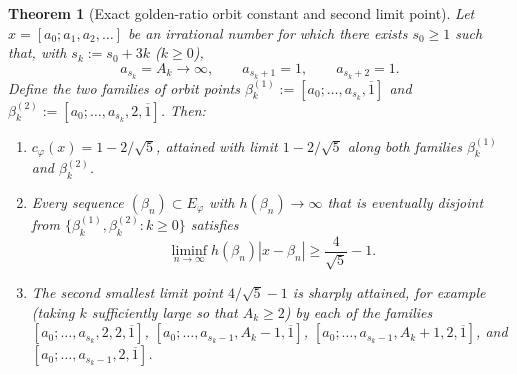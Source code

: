 \documentclass[11pt]{amsart}
\newtheorem{theorem}{Theorem}[section]
\theoremstyle{definition}
\theoremstyle{remark}
\numberwithin{equation}{section}
\begin{document}
\begin{theorem}[Exact golden-ratio orbit constant and second limit point]\label{thm:golden-exact-second}
Let $x=[a_0;a_1,a_2,\ldots]$ be an irrational number for which there
exists $s_0\ge1$ such that, with $s_k:=s_0+3k$ ($k\ge0$),
\[
 a_{s_k}=A_k\to\infty,\qquad a_{s_k+1}=1,\qquad a_{s_k+2}=1.
\]
Define the two families of orbit points
$\beta_k^{(1)}:=[a_0;\ldots,a_{s_k},\overline1]$ and
$\beta_k^{(2)}:=[a_0;\ldots,a_{s_k},2,\overline1]$. Then:
\begin{enumerate}
\item $c_\varphi(x)=1-2/\sqrt5$, attained with limit $1-2/\sqrt5$ along
      both families $\beta_k^{(1)}$ and $\beta_k^{(2)}$.
\item Every sequence $(\beta_n)\subset E_\varphi$ with
      $h(\beta_n)\to\infty$ that is eventually disjoint from
      $\{\beta_k^{(1)},\beta_k^{(2)}:k\ge0\}$ satisfies
      \[
       \liminf_{n\to\infty} h(\beta_n)|x-\beta_n|\ge \frac{4}{\sqrt5}-1.
      \]
\item The second smallest limit point $4/\sqrt5-1$ is sharply attained,
      for example (taking $k$ sufficiently large so that $A_k\ge2$) by each
      of the families
      $[a_0;\ldots,a_{s_k},2,2,\overline1]$,
      $[a_0;\ldots,a_{s_k-1},A_k-1,\overline1]$,
      $[a_0;\ldots,a_{s_k-1},A_k+1,2,\overline1]$, and
      $[a_0;\ldots,a_{s_k-1},2,\overline1]$.
\end{enumerate}
\end{theorem}
\end{document}
